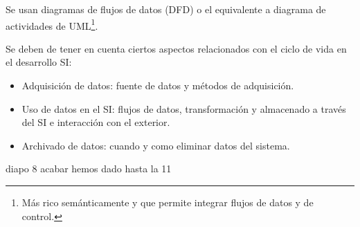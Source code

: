 \documentclass[12pt]{book} %
\providecommand{\tightlist}{%
  \setlength{\itemsep}{0pt}\setlength{\parskip}{0pt}}
\begin{document}
Se usan diagramas de flujos de datos (DFD) o el equivalente a diagrama
de actividades de
UML\footnote{Más rico semánticamente y que permite integrar flujos de datos y de control.}.

Se deben de tener en cuenta ciertos aspectos relacionados con el ciclo
de vida en el desarrollo SI:

\begin{itemize}
\tightlist
\item
  Adquisición de datos: fuente de datos y métodos de adquisición.
\item
  Uso de datos en el SI: flujos de datos, transformación y almacenado a
  través del SI e interacción con el exterior.
\item
  Archivado de datos: cuando y como eliminar datos del sistema.
\end{itemize}

diapo 8 acabar hemos dado hasta la 11


\end{document}
